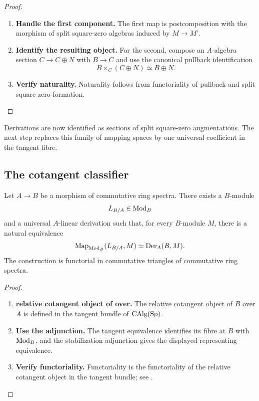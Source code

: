 \begin{proof}
\leavevmode
\begin{enumerate}[label=\textup{(\arabic*)}]
    \item \textbf{Handle the first component.}
    The first map is postcomposition with the morphism of split square-zero algebras induced by
    \(M\to M'\).

    \item \textbf{Identify the resulting object.}
    For the second, compose an \(A\)-algebra section \(C\to C\oplus N\) with \(B\to C\) and use
    the canonical pullback identification
    \[
        B\times_C(C\oplus N)
        \simeq
        B\oplus N.
    \]

    \item \textbf{Verify naturality.}
    Naturality follows from functoriality of pullback and split square-zero formation.
\end{enumerate}
\end{proof}
Derivations are now identified as sections of split square-zero
augmentations. The next step replaces this family of mapping spaces by one
universal coefficient in the tangent fibre.

\subsection{The cotangent classifier}

\begin{theorem}
\label{thm:relative-cotangent-classifier}
Let \(A\to B\) be a morphism of commutative ring spectra. There exists a
\(B\)-module
\[
    L_{B/A}\in\operatorname{Mod}_B
\]
and a universal \(A\)-linear derivation such that, for every \(B\)-module
\(M\), there is a natural equivalence
\[
    \operatorname{Map}_{\operatorname{Mod}_B}(L_{B/A},M)
    \simeq
    \operatorname{Der}_A(B,M).
\]
The construction is functorial in commutative triangles of commutative ring
spectra.
\end{theorem}

\begin{proof}
\leavevmode
\begin{enumerate}[label=\textup{(\arabic*)}]
    \item \textbf{relative cotangent object of over.}
    The relative cotangent object of \(B\) over \(A\) is defined in the tangent
    bundle of \(\operatorname{CAlg}(\operatorname{Sp})\).

    \item \textbf{Use the adjunction.}
    The tangent equivalence  identifies its fibre at \(B\)
    with \(\operatorname{Mod}_B\), and the stabilization adjunction gives the displayed representing
    equivalence.

    \item \textbf{Verify functoriality.}
    Functoriality is the functoriality of the relative cotangent object in the tangent bundle;
    see \cite{LurieHigherAlgebra,LurieDAGIV}.
\end{enumerate}
\end{proof}

